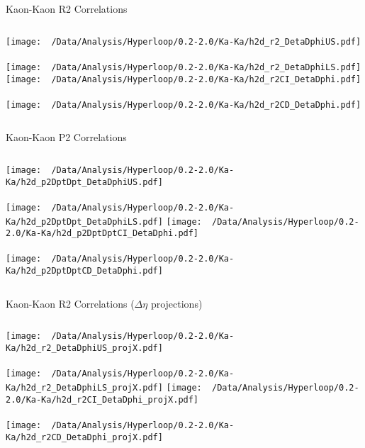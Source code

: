 \documentclass{beamer}
\begin{document}
\begin{frame}{Kaon-Kaon R2 Correlations}
	\begin{columns}
		\centering
		\texttt{[image: ~/Data/Analysis/Hyperloop/0.2-2.0/Ka-Ka/h2d\_r2\_DetaDphiUS.pdf]}\\~\\
		\texttt{[image: ~/Data/Analysis/Hyperloop/0.2-2.0/Ka-Ka/h2d\_r2\_DetaDphiLS.pdf]}
		\centering
		\texttt{[image: ~/Data/Analysis/Hyperloop/0.2-2.0/Ka-Ka/h2d\_r2CI\_DetaDphi.pdf]}\\~\\
		\texttt{[image: ~/Data/Analysis/Hyperloop/0.2-2.0/Ka-Ka/h2d\_r2CD\_DetaDphi.pdf]}
	\end{columns}
\end{frame}
\begin{frame}{Kaon-Kaon P2 Correlations}
	\begin{columns}
		\column{0.5\linewidth}
		\centering
		\texttt{[image: ~/Data/Analysis/Hyperloop/0.2-2.0/Ka-Ka/h2d\_p2DptDpt\_DetaDphiUS.pdf]}\\~\\
		\texttt{[image: ~/Data/Analysis/Hyperloop/0.2-2.0/Ka-Ka/h2d\_p2DptDpt\_DetaDphiLS.pdf]}
		\column{0.5\linewidth}
		\centering
		\texttt{[image: ~/Data/Analysis/Hyperloop/0.2-2.0/Ka-Ka/h2d\_p2DptDptCI\_DetaDphi.pdf]}\\~\\
		\texttt{[image: ~/Data/Analysis/Hyperloop/0.2-2.0/Ka-Ka/h2d\_p2DptDptCD\_DetaDphi.pdf]}
	\end{columns}
\end{frame}
\begin{frame}{Kaon-Kaon R2 Correlations ($\Delta\eta$ projections)}
	\begin{columns}
		\centering
		\texttt{[image: ~/Data/Analysis/Hyperloop/0.2-2.0/Ka-Ka/h2d\_r2\_DetaDphiUS\_projX.pdf]}\\~\\
		\texttt{[image: ~/Data/Analysis/Hyperloop/0.2-2.0/Ka-Ka/h2d\_r2\_DetaDphiLS\_projX.pdf]}
		\centering
		\texttt{[image: ~/Data/Analysis/Hyperloop/0.2-2.0/Ka-Ka/h2d\_r2CI\_DetaDphi\_projX.pdf]}\\~\\
		\texttt{[image: ~/Data/Analysis/Hyperloop/0.2-2.0/Ka-Ka/h2d\_r2CD\_DetaDphi\_projX.pdf]}
	\end{columns}
\end{frame}
\end{document}
